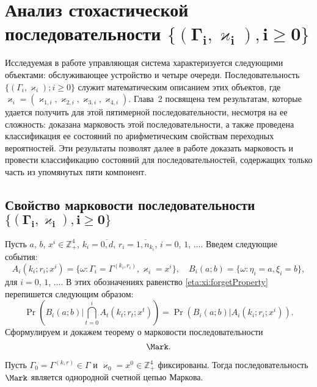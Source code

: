 \chapter{Анализ стохастической последовательности $\boldsymbol{\{(\Gamma_i,  \varkappa_{i}), i \geqslant 0\}}$}						%

Исследуемая в работе управляющая система характеризуется следующими объектами:  обслуживающее устройство и четыре очереди. Последовательность 
 $\{(\Gamma_i,  \varkappa_i); i \geqslant 0\}$ служит математическим описанием этих объектов, где $ \varkappa_i = (\varkappa_{1, i},  \varkappa_{2, i},  \varkappa_{3, i},   \varkappa_{4, i})$. Глава~2 посвящена тем результатам,  которые удается получить для этой пятимерной последовательности,  несмотря на ее сложность: доказана марковость этой последовательности,  а также проведена классификация ее состояний по арифметическим свойствам переходных вероятностей. Эти результаты позволят далее в работе доказать марковость и провести классификацию состояний для последовательностей,  содержащих только часть из упомянутых пяти компонент.

\section[Свойство марковости последовательности $\{(\Gamma_i,  \varkappa_{i}), i \geqslant 0\}$]%
{Свойство марковости последовательности $\boldsymbol{\{(\Gamma_i,  \varkappa_{i}), i \geqslant 0\}}$}
Пусть $a$,  $b$,  $x^i \in \mathbb{Z}_+^4$,  $k_i=\overline{0,d}$,  $r_i=\overline{1,n_{k_i}}$,  $i=0$,  $1$,  $\ldots$. Введем следующие события:
\begin{equation}
A_i(k_i;r_i;x^i) = \{\omega\colon\Gamma_i=\Gamma^{(k_i, r_i)},  \varkappa_i=x^i\},  \quad  B_i(a;b) = \{\omega\colon\eta_i=a,  \xi_i=b\}, 
\label{A:definition}
\end{equation}
 для $i=0$,  $1$,  $\ldots$.
В этих обозначениях равенство \eqref{eta:xi:forgetProperty}  перепишется следующим образом:
\begin{equation}
\Pr (B_i(a;b) | \bigcap_{t=0}^{i} A_t(k_t;r_t;x^t)) = \Pr (B_i(a;b) |  A_i(k_i;r_i;x^i)).
\label{new:notation:eta:xi:forget}
\end{equation}
Сформулируем и докажем теорему о марковости последовательности 
$$\Mark.$$
\begin{theorem}
Пусть $\Gamma_0=\Gamma^{(k, r)}\in \Gamma$ и $\varkappa_0=x^0\in \mathbb{Z}_+^4$ фиксированы. Тогда последовательность $\Mark$ является однородной счетной цепью Маркова. 
\end{theorem}

